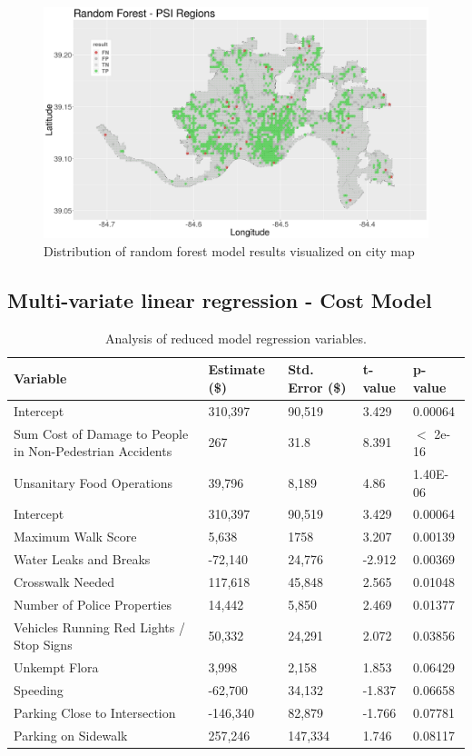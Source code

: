 \documentclass{llncs}
\begin{document}
\FloatBarrier
\begin{figure}
 	\includegraphics[width=\textwidth, height=\textheight, keepaspectratio]{RFBinaryResultsMap.png}
 	\caption{Distribution of random forest model results visualized on city map}
	\label{figure : rfbinarymap}
\end{figure}
\FloatBarrier

\subsection{Multi-variate linear regression - Cost Model}

\FloatBarrier
\begin{table}[!h]
\begin{center}
\caption{Analysis of reduced model regression variables.}
\label{table:RegressionAnalysis}
\begin{tabular}{ p{} p{} p{} p{} p{}}
\hline
\rule{0pt}{12pt}
Variable
& Estimate (\$)
& Std. Error (\$)
& t-value
& p-value\\[2pt]
\hline
Intercept&310,397&90,519&3.429&0.00064\\
Sum Cost of Damage to People in Non-Pedestrian Accidents&267&31.8&8.391&$<$ 2e-16\\
Unsanitary Food Operations&39,796&8,189&4.86&1.40E-06\\
Intercept&310,397&90,519&3.429&0.00064\\
Maximum Walk Score&5,638&1758&3.207&0.00139\\
Water Leaks and Breaks&-72,140&24,776&-2.912&0.00369\\
Crosswalk Needed&117,618&45,848&2.565&0.01048\\
Number of Police Properties&14,442&5,850&2.469&0.01377\\
Vehicles Running Red Lights / Stop Signs&50,332&24,291&2.072&0.03856\\
Unkempt Flora&3,998&2,158&1.853&0.06429\\
Speeding&-62,700&34,132&-1.837&0.06658\\
Parking Close to Intersection&-146,340&82,879&-1.766&0.07781\\
Parking on Sidewalk&257,246&147,334&1.746&0.08117\\[2pt]
\hline
\end{tabular}
\end{center}
\end{table}
\FloatBarrier
\end{document}
